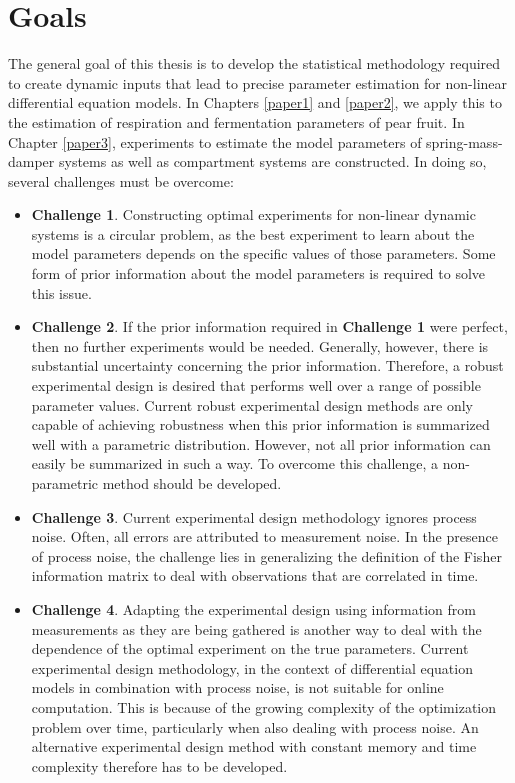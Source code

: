 \section{Goals}
The general goal of this thesis is to develop the statistical methodology required to create dynamic inputs that lead to precise parameter estimation for non-linear differential equation models. In Chapters \ref{paper1} and \ref{paper2}, we apply this to the estimation of respiration and fermentation parameters of pear fruit. {\color{red}In Chapter \ref{paper3}, experiments to estimate the model parameters of spring-mass-damper systems as well as compartment systems are constructed.} In doing so, several challenges  must be overcome:
\begin{itemize}
	\item \textbf{Challenge 1}. Constructing optimal experiments for non-linear dynamic systems is a circular problem, as the best experiment to learn about the model parameters depends on the specific values of those parameters. Some form of prior information about the model parameters is required to solve this issue.
	\item \textbf{Challenge 2}. If the prior information required in \textbf{Challenge 1} were perfect, then no further experiments would be needed. Generally, however, there is substantial uncertainty concerning the prior information. Therefore, a robust experimental design is desired that performs well over a range of possible parameter values. {\color{red}Current robust experimental design methods are only capable of achieving robustness when this prior information is summarized well with a parametric distribution. However, not all prior information can easily be summarized in such a way. To overcome this challenge, a non-parametric method should be developed.}
	\item \textbf{Challenge 3}. Current experimental design methodology ignores process noise. Often, all errors are attributed to measurement noise. {\color{red}In the presence of process noise, the challenge lies in generalizing the definition of the Fisher information matrix to deal with observations that are correlated in time.}
	\item \textbf{Challenge 4}. Adapting the experimental design using information from measurements as they are being gathered is another way to deal with the dependence of the optimal experiment on the true parameters. {\color{red}Current experimental design methodology, in the context of differential equation models in combination with process noise, is not suitable for online computation. This is because of} the growing complexity of the optimization problem over time, particularly when also dealing with process noise. {\color{red}An alternative experimental design method with constant memory and time complexity therefore has to be developed.}
\end{itemize}
